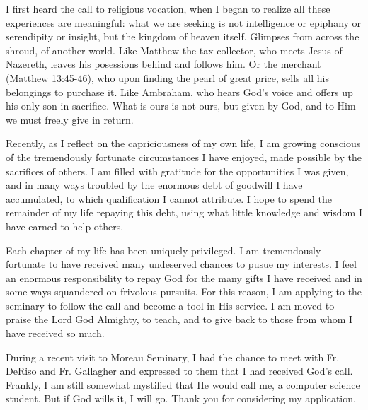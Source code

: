 \documentclass[11pt]{article}
\begin{document}
I first heard the call to religious vocation, when I began to realize all these experiences are meaningful: what we are seeking is not intelligence or epiphany or serendipity or insight, but the kingdom of heaven itself. Glimpses from across the shroud, of another world. Like Matthew the tax collector, who meets Jesus of Nazereth, leaves his posessions behind and follows him. Or the merchant (Matthew 13:45-46), who upon finding the pearl of great price, sells all his belongings to purchase it. Like Ambraham, who hears God's voice and offers up his only son in sacrifice. What is ours is not ours, but given by God, and to Him we must freely give in return.

Recently, as I reflect on the capriciousness of my own life, I am growing conscious of the tremendously fortunate circumstances I have enjoyed, made possible by the sacrifices of others. I am filled with gratitude for the opportunities I was given, and in many ways troubled by the enormous debt of goodwill I have accumulated, to which qualification I cannot attribute. I hope to spend the remainder of my life repaying this debt, using what little knowledge and wisdom I have earned to help others.

Each chapter of my life has been uniquely privileged. I am tremendously fortunate to have received many undeserved chances to pusue my interests. I feel an enormous responsibility to repay God for the many gifts I have received and in some ways squandered on frivolous pursuits. For this reason, I am applying to the seminary to follow the call and become a tool in His service. I am moved to praise the Lord God Almighty, to teach, and to give back to those from whom I have received so much.

During a recent visit to Moreau Seminary, I had the chance to meet with Fr. DeRiso and Fr. Gallagher and expressed to them that I had received God's call. Frankly, I am still somewhat mystified that He would call me, a computer science student. But if God wills it, I will go. Thank you for considering my application.
\end{document}
